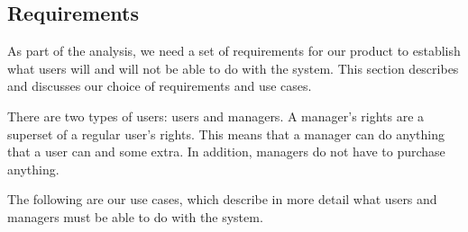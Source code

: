 \subsection{Requirements}
As part of the analysis, we need a set of requirements for our product to establish what users will and will not be able to do with the system. This section describes and discusses our choice of requirements and use cases.


There are two types of users: users and managers. A manager’s rights are a superset of a regular user’s rights. This means that a manager can do anything that a user can and some extra. In addition, managers do not have to purchase anything.


The following are our use cases, which describe in more detail what users and managers must be able to do with the system.

